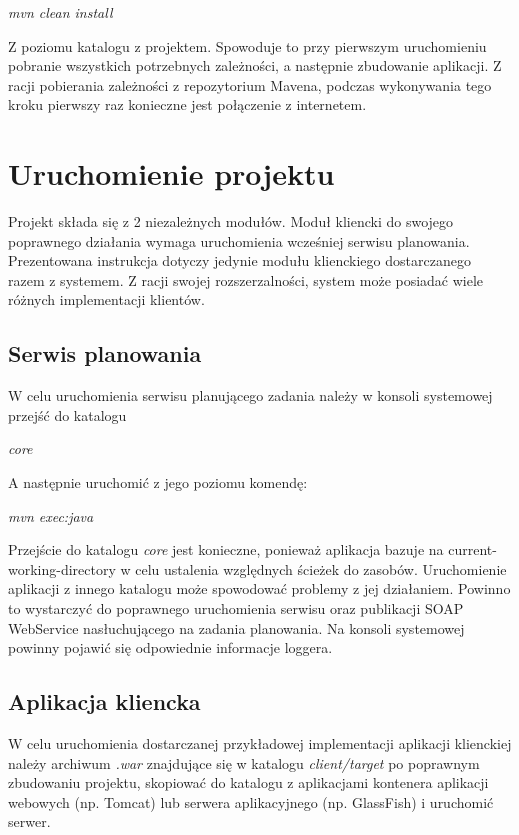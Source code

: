 		{\it mvn clean install}

 Z poziomu katalogu z projektem. 
 Spowoduje to przy pierwszym uruchomieniu pobranie wszystkich potrzebnych zależności, a następnie zbudowanie aplikacji.
 Z racji pobierania zależności z repozytorium Mavena, podczas wykonywania tego kroku pierwszy raz konieczne jest połączenie z internetem.

\section{Uruchomienie projektu}

Projekt składa się z 2 niezależnych modułów.
Moduł kliencki do swojego poprawnego działania wymaga uruchomienia wcześniej serwisu planowania.
Prezentowana instrukcja dotyczy jedynie modułu klienckiego dostarczanego razem z systemem.
Z racji swojej rozszerzalności, system może posiadać wiele różnych implementacji klientów.

\subsection{Serwis planowania}

W celu uruchomienia serwisu planującego zadania należy w konsoli systemowej przejść do katalogu

	{\it core}
	
A następnie uruchomić z jego poziomu komendę:

	{\it mvn exec:java}
	
Przejście do katalogu {\it core} jest konieczne, ponieważ aplikacja bazuje na current-working-directory w celu ustalenia względnych ścieżek do zasobów.
Uruchomienie aplikacji z innego katalogu może spowodować problemy z jej działaniem.
Powinno to wystarczyć do poprawnego uruchomienia serwisu oraz publikacji SOAP WebService nasłuchującego na zadania planowania.
Na konsoli systemowej powinny pojawić się odpowiednie informacje loggera.

\subsection{Aplikacja kliencka}

W celu uruchomienia dostarczanej przykładowej implementacji aplikacji klienckiej należy archiwum {\it *.war} znajdujące się w katalogu {\it client/target} po poprawnym zbudowaniu projektu, skopiować do katalogu z aplikacjami kontenera aplikacji webowych (np. Tomcat) lub serwera aplikacyjnego (np. GlassFish) i uruchomić serwer.
	
